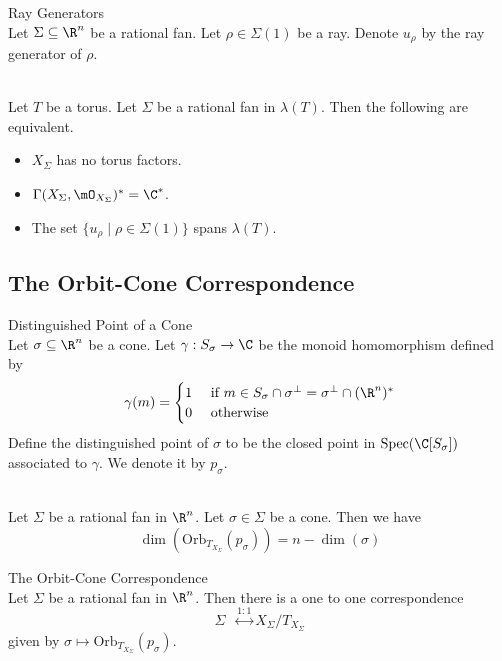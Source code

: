 \documentclass[a4paper]{article}
\begin{document}
\begin{defn}{Ray Generators}{}\\
Let $\Sigma\subseteq\R^n$ be a rational fan. Let $\rho\in\Sigma(1)$ be a ray. Denote $u_\rho$ by the ray generator of $\rho$. 
\end{defn}

\begin{prp}{}{}\\
Let $T$ be a torus. Let $\Sigma$ be a rational fan in $\lambda(T)$. Then the following are equivalent. 
\begin{itemize}
\item $X_\Sigma$ has no torus factors. 
\item $\Gamma(X_\Sigma,\mO_{X_\Sigma})^\ast=\C^\ast$. 
\item The set $\{u_\rho\;|\;\rho\in\Sigma(1)\}$ spans $\lambda(T)$. 
\end{itemize}
\end{prp}

\subsection{The Orbit-Cone Correspondence}
\begin{defn}{Distinguished Point of a Cone}{}\\
Let $\sigma\subseteq\R^n$ be a cone. Let $\gamma:S_\sigma\to\C$ be the monoid homomorphism defined by $$\gamma(m)=\begin{cases}
1 & \text{ if } m\in S_\sigma\cap\sigma^\perp=\sigma^\perp\cap(\R^n)^\ast\\
0 & \text{ otherwise }
\end{cases}$$
Define the distinguished point of $\sigma$ to be the closed point in $\text{Spec}(\C[S_\sigma])$ associated to $\gamma$. We denote it by $p_\sigma$. 
\end{defn}

\begin{lmm}{}{}\\
Let $\Sigma$ be a rational fan in $\R^n$. Let $\sigma\in\Sigma$ be a cone. Then we have $$\dim(\text{Orb}_{T_{X_\Sigma}}(p_\sigma))=n-\dim(\sigma)$$
\end{lmm}

\begin{thm}{The Orbit-Cone Correspondence}{}\\
Let $\Sigma$ be a rational fan in $\R^n$. Then there is a one to one correspondence $$\Sigma\;\;\overset{1:1}{\longleftrightarrow}X_\Sigma/T_{X_\Sigma}$$ given by $\sigma\mapsto\text{Orb}_{T_{X_\Sigma}}(p_\sigma)$. 
\end{thm}
\end{document}
